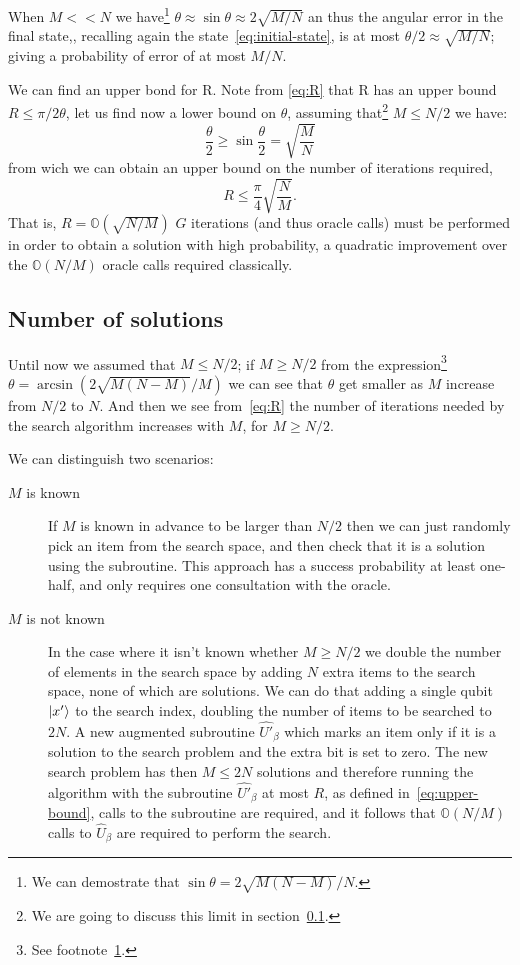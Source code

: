 When $M<<N$ we have\footnote{\label{foot:sin}We can demostrate that $\sin\theta = 2\sqrt{M(N-M)}/N$.} $\theta \approx \sin\theta \approx 2\sqrt{M/N}$ an thus the angular error in the final state,, recalling again the state~\ref{eq:initial-state}, is at most $\theta/2 \approx \sqrt{M/N}$; giving a probability of error of at most $M/N$.

We can find an upper bond for R. Note from \ref{eq:R}  that R has an upper bound $R \leq \pi/2\theta$, let us find now a lower bound on $\theta$, assuming that\footnote{We are going to discuss this limit in section~\ref{sec:M}.} $M \leq N/2$ we have:
\begin{equation*}
    \frac{\theta}{2} \geq \sin\frac{\theta}{2} = \sqrt{\frac{M}{N}}
\end{equation*}
from wich we can obtain an upper bound on the number of iterations required,
\begin{equation}\label{eq:upper-bound}
    R \leq \frac{\pi}{4} \sqrt{\frac{N}{M}}.
\end{equation}
That is, $R = \mathbb{O}(\sqrt{N/M})$ $G$ iterations (and thus oracle calls) must be performed in order to obtain a solution with high probability, a quadratic improvement over the $\mathbb{O}(N/M)$ oracle calls required classically.

\subsection{Number of solutions}\label{sec:M}
Until now we assumed that $M\leq N/2$; if $M \geq N/2$ from the expression\footnote{See footnote~\ref{foot:sin}.} $\theta=\arcsin(2\sqrt{M(N-M)}/M)$ we can see that $\theta$ get smaller as $M$ increase from $N/2$ to $N$. And then we see from~\ref{eq:R} the number of iterations needed by the search algorithm increases with $M$, for $M\geq N/2$.

We can distinguish two scenarios:
\begin{description}
   \item[$M$ is known] If $M$ is known in advance to be larger than $N/2$ then we can just randomly pick an item from the search space, and then check that it is a solution using the subroutine. This approach has a success probability at least one-half, and only requires one consultation with the oracle.
   \item[$M$ is not known] In the case where it isn't known whether $M\geq N/2$ we double the number of elements in the search space by adding $N$ extra items to the search space, none of which are solutions. We can do that adding a single qubit $\ket{x'}$ to the search index, doubling the number of items to be searched to $2N$. A new augmented subroutine $\hat{U'}_\beta$ which marks an item only if it is a solution to the search problem and the extra bit is set to zero. The new search problem has then $M \leq 2N$ solutions and therefore running the algorithm with the subroutine $\hat{U'}_\beta$ at most $R$, as defined in~\ref{eq:upper-bound}, calls to the subroutine are required, and it follows that $\mathbb{O}(N/M)$ calls to $\hat{U}_\beta$ are required to perform the search.
\end{description}
